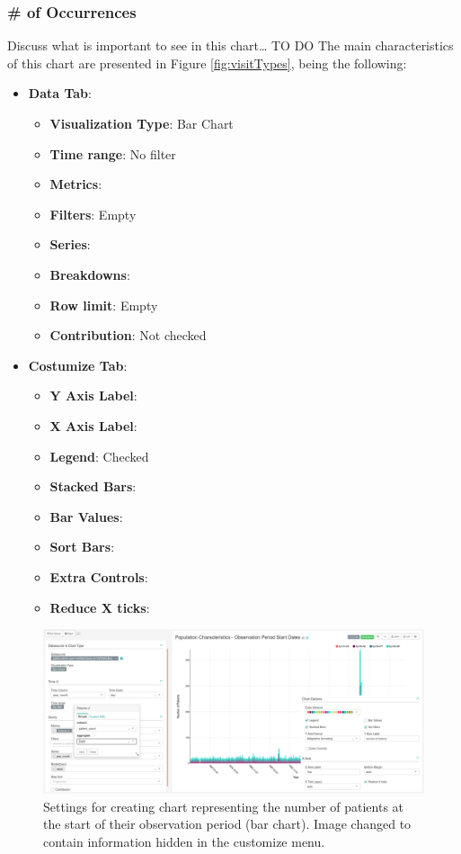 \documentclass[]{book}
\providecommand{\tightlist}{%
  \setlength{\itemsep}{0pt}\setlength{\parskip}{0pt}}
\begin{document}
\subsubsection{\# of Occurrences}\label{of-occurrences}

Discuss what is important to see in this chart\ldots{} TO DO The main
characteristics of this chart are presented in Figure
\ref{fig:visitTypes}, being the following:

\begin{itemize}
\tightlist
\item
  \textbf{Data Tab}:

  \begin{itemize}
  \tightlist
  \item
    \textbf{Visualization Type}: Bar Chart
  \item
    \textbf{Time range}: No filter
  \item
    \textbf{Metrics}:
  \item
    \textbf{Filters}: Empty
  \item
    \textbf{Series}:
  \item
    \textbf{Breakdowns}:
  \item
    \textbf{Row limit}: Empty
  \item
    \textbf{Contribution}: Not checked
  \end{itemize}
\item
  \textbf{Costumize Tab}:

  \begin{itemize}
  \tightlist
  \item
    \textbf{Y Axis Label}:
  \item
    \textbf{X Axis Label}:
  \item
    \textbf{Legend}: Checked
  \item
    \textbf{Stacked Bars}:
  \item
    \textbf{Bar Values}:
  \item
    \textbf{Sort Bars}:
  \item
    \textbf{Extra Controls}:
  \item
    \textbf{Reduce X ticks}:
  \end{itemize}
\end{itemize}

\begin{figure}
\includegraphics[width=1\linewidth]{images/populationCharacteristicsObservationPeriodStartDates} \caption{Settings for creating chart representing the number of patients at the start of their observation period (bar chart). Image changed to contain information hidden in the customize menu.}\label{fig:visitTypes4}
\end{figure}
\end{document}
